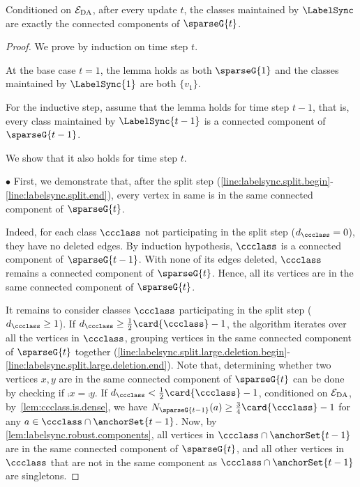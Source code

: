 \begin{lemma}
\label{lem:labelsync.classes.are.connected.components}
Conditioned on $ \mathcal{E}_{\rm DA} $, after every update $ t $, the classes maintained by $ \LabelSync $ are exactly the connected components of $ \sparseG{t} $.
\end{lemma}
\begin{proof}
    We prove by induction on time step $ t $.

    At the base case $ t=1 $, the lemma holds as both $ \sparseG{1} $ and the classes maintained by $ \LabelSync{1} $ are both $ \{v_{1}\} $.

    For the inductive step, assume that the lemma holds for time step $ t-1 $, that is, every class maintained by $ \LabelSync{t-1} $ is a connected component of $ \sparseG{t-1} $.

    We show that it also holds for time step $ t $.

    $ \bullet $ First, we demonstrate that, after the split step (\cref{line:labelsync.split.begin}-\cref{line:labelsync.split.end}), every vertex in same \piece{} is in the same connected component of $ \sparseG{t} $. 

    Indeed, for each class $ \ccclass $ not participating in the split step ($ d_{\ccclass} = 0 $), they have no deleted edges.
    By induction hypothesis, $ \ccclass $ is a connected component of $ \sparseG{t-1} $. With none of its edges deleted, $ \ccclass $ remains a connected component of $ \sparseG{t} $.
    Hence, all its vertices are in the same connected component of $ \sparseG{t} $.

    It remains to consider classes $ \ccclass $ participating in the split step ($ d_{\ccclass} \geq 1 $).
    If $ d_{\ccclass} \geq \frac{1}{2}\card{\ccclass}-1 $, the algorithm iterates over all the vertices in $ \ccclass $, grouping vertices in the same connected component of $ \sparseG{t} $ together (\cref{line:labelsync.split.large.deletion.begin}-\cref{line:labelsync.split.large.deletion.end}).
    Note that, determining whether two vertices $ x,y $ are in the same connected component of $ \sparseG{t} $ can be done by checking if $ \comp{x} = \comp{y} $. 
    If $ d_{\ccclass} < \frac{1}{2}\card{\ccclass} - 1 $, conditioned on $ \mathcal{E}_{\rm DA} $, by~\cref{lem:ccclass.is.dense}, we have $ \openN{\sparseG{t-1}}{a} \geq \frac{3}{4}\card{\ccclass}-1 $ for any $ a \in \ccclass \cap \anchorSet{t-1} $.
    Now, by \cref{lem:labelsync.robust.components}, all vertices in $ \ccclass \cap \anchorSet{t-1} $ are in the same connected component of $ \sparseG{t} $, and all other vertices in $ \ccclass $ that are not in the same component as $ \ccclass \cap \anchorSet{t-1} $ are singletons.


\end{proof}
